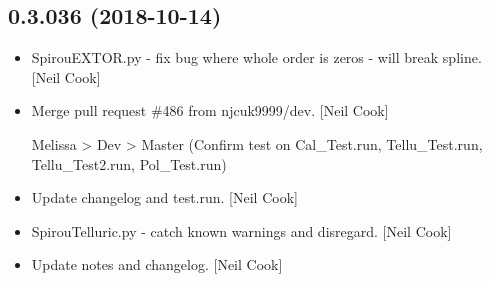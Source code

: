 \documentclass[a4paper,10pt,english]{report}
\begin{document}
\subsection{0.3.036 (2018-10-14)}
\label{\detokenize{misc/changelog:id294}}\begin{itemize}
\item {} 
SpirouEXTOR.py  - fix bug where whole order is zeros - will break
spline. {[}Neil Cook{]}

\item {} 
Merge pull request \#486 from njcuk9999/dev. {[}Neil Cook{]}

Melissa \textendash{}\textgreater{} Dev \textendash{}\textgreater{} Master (Confirm test on Cal\_Test.run, Tellu\_Test.run, Tellu\_Test2.run, Pol\_Test.run)

\item {} 
Update changelog and test.run. {[}Neil Cook{]}

\item {} 
SpirouTelluric.py - catch known warnings and disregard. {[}Neil Cook{]}

\item {} 
Update notes and changelog. {[}Neil Cook{]}

\end{itemize}
\end{document}
